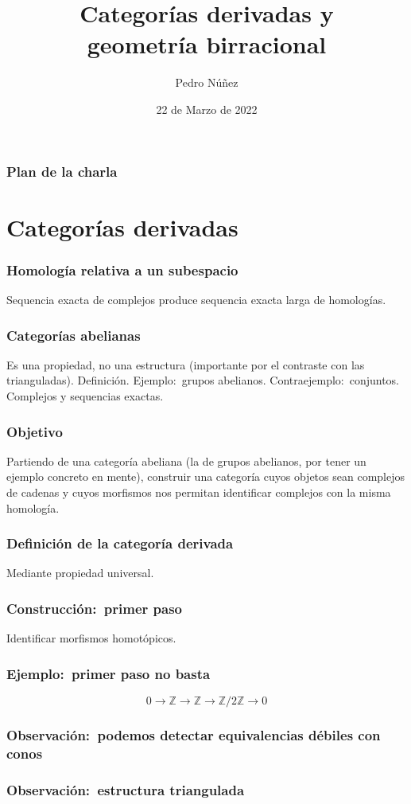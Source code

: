 \documentclass[12pt]{beamer}
\title[Categorías derivadas y geometría birracional]{Categorías derivadas y \\ geometría birracional}
\author{Pedro N\'{u}\~{n}ez}
\institute{Red de Doctorandos en Matemáticas UCM}
\date{22 de Marzo de 2022}
\begin{document}
\frame{\titlepage}

\begin{frame}
  \frametitle{Plan de la charla}
  \tableofcontents
\end{frame}

\section{Categorías derivadas}

\begin{frame}
  \frametitle{Homología relativa a un subespacio}
  Sequencia exacta de complejos produce sequencia exacta larga de homologías.
\end{frame}

\begin{frame}
  \frametitle{Categorías abelianas}
  Es una propiedad, no una estructura (importante por el contraste con las trianguladas).
  Definición.
  Ejemplo:~grupos abelianos.
  Contraejemplo:~conjuntos.
  Complejos y sequencias exactas.
\end{frame}

\begin{frame}
  \frametitle{Objetivo}
  Partiendo de una categoría abeliana (la de grupos abelianos, por tener un ejemplo concreto en mente), construir una categoría cuyos objetos sean complejos de cadenas y cuyos morfismos nos permitan identificar complejos con la misma homología.
\end{frame}

\begin{frame}
  \frametitle{Definición de la categoría derivada}
  Mediante propiedad universal.
\end{frame}

\begin{frame}
  \frametitle{Construcción:~primer paso}
  Identificar morfismos homotópicos.
\end{frame}

\begin{frame}
  \frametitle{Ejemplo:~primer paso no basta}
  \[ 0 \to \mathbb{Z} \to \mathbb{Z} \to \mathbb{Z}/2\mathbb{Z} \to 0 \]
\end{frame}

\begin{frame}
  \frametitle{Observación:~podemos detectar equivalencias débiles con conos}
\end{frame}

\begin{frame}
  \frametitle{Observación:~estructura triangulada}
\end{frame}
\end{document}
